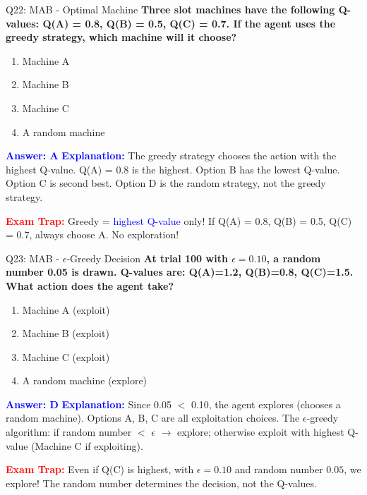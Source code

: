 \documentclass[8pt]{beamer}
\begin{document}
	\begin{frame}{Q22: MAB - Optimal Machine}
		\fontsize{6.5}{7.5}\selectfont
		\textbf{Three slot machines have the following Q-values: Q(A) = 0.8, Q(B) = 0.5, Q(C) = 0.7. If the agent uses the greedy strategy, which machine will it choose?}
		
		\begin{enumerate}
			\item Machine A
			\item Machine B
			\item Machine C
			\item A random machine
		\end{enumerate}
		
		\vspace{0.1cm}
		\textcolor{blue}{\textbf{Answer: A}}
		\vspace{0.1cm}
		\textcolor{blue}{\textbf{Explanation:}} The greedy strategy chooses the action with the highest Q-value. Q(A) = 0.8 is the highest. Option B has the lowest Q-value. Option C is second best. Option D is the random strategy, not the greedy strategy.
		
		\textcolor{red}{\textbf{Exam Trap:}} Greedy = \textcolor{blue}{highest Q-value} only! If Q(A) = 0.8, Q(B) = 0.5, Q(C) = 0.7, always choose A. No exploration!
	\end{frame}
	
	\begin{frame}{Q23: MAB - $\epsilon$-Greedy Decision}
		\fontsize{6.5}{7.5}\selectfont
		\textbf{At trial 100 with $\epsilon = 0.10$, a random number 0.05 is drawn. Q-values are: Q(A)=1.2, Q(B)=0.8, Q(C)=1.5. What action does the agent take?}
		
		\begin{enumerate}
			\item Machine A (exploit)
			\item Machine B (exploit)
			\item Machine C (exploit)
			\item A random machine (explore)
		\end{enumerate}
		
		\vspace{0.1cm}
		\textcolor{blue}{\textbf{Answer: D}}
		\vspace{0.1cm}
		\textcolor{blue}{\textbf{Explanation:}} Since 0.05 $<$ 0.10, the agent explores (chooses a random machine). Options A, B, C are all exploitation choices. The $\epsilon$-greedy algorithm: if random number $<$ $\epsilon$ $\rightarrow$ explore; otherwise exploit with highest Q-value (Machine C if exploiting).
		
		\textcolor{red}{\textbf{Exam Trap:}} Even if Q(C) is highest, with $\epsilon=0.10$ and random number $0.05$, we explore! The random number determines the decision, not the Q-values.
	\end{frame}
	
\end{document}
